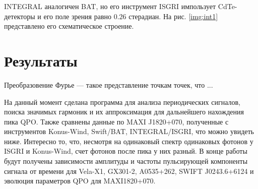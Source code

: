 	INTEGRAL аналогичен BAT, но его инструмент ISGRI импользует CdTe-детекторы и его поле зрения равно $0.26$ стерадиан. На рис. \ref{img:int1} представлено его схематическое строение. 
			 
\newpage
	
\section*{Результаты}
	

	Преобразовение Фурье --- такое представление точкам точек, что ...

	На данный момент сделана программа для анализа периодических сигналов, поиска значимых гармоник и их аппроксимация для дальнейшего нахождения пика QPO. Также сравнены данные по MAXI J1820+070, полученные с инструментов Konus-Wind, Swift/BAT, INTEGRAL/ISGRI, что можно увидеть ниже. Интересно то, что, несмотря на одинаковый спектр одинаковых фотонов у ISGRI и Konus-Wind, счет фотонов после пика у них разный. В конце работы будут получены зависимости амплитуды и частоты пульсирующей компоненты сигнала от времени для Vela-X1, GX301-2, A0535+262, SWIFT J0243.6+6124 и эволюция параметров QPO для MAXI1820+070.
	
	
